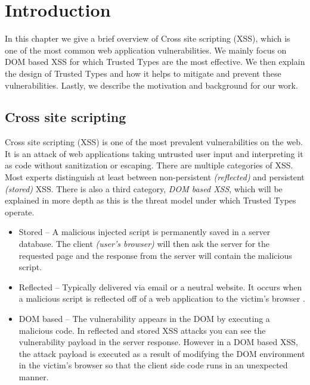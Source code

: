\chapter{Introduction}
\label{chapter_intro}

In this chapter we give a brief overview of Cross site scripting (XSS), which is one of the most
common web application vulnerabilities. We mainly focus on DOM based XSS for which Trusted Types are
the most effective. We then explain the design of Trusted Types and how it helps to mitigate and
prevent these vulnerabilities. Lastly, we describe the motivation and background for our work.

\section{Cross site scripting}

Cross site scripting (XSS) is one of the most prevalent vulnerabilities on the web. It is an attack
of web applications taking untrusted user input and interpreting it as code without sanitization or
escaping. There are multiple categories of XSS. Most experts distinguish at least between
non-persistent \emph{(reflected)} and persistent \emph{(stored)} XSS. There is also a third
category, \emph{DOM based XSS}, which will be explained in more depth as this is the threat model
under which Trusted Types operate.

\begin{itemize}
  \item  Stored -- A malicious injected script is permanently saved in a server database. The client
        \emph{(user's browser)} will then ask the server for the requested page and the response
        from the server will contain the malicious script.
  \item  Reflected -- Typically delivered via email or a neutral website. It occurs when a
        malicious script is reflected off of a web application to the victim's browser
        \cite{reflected_xss}.
  \item  DOM based -- The vulnerability appears in the DOM by executing a malicious code. In
        reflected and stored XSS attacks you can see the vulnerability payload in the server
        response. However in a DOM based XSS, the attack payload is executed as a result of
        modifying the DOM environment in the victim's browser so that the client side code runs in
        an unexpected manner.
\end{itemize}


